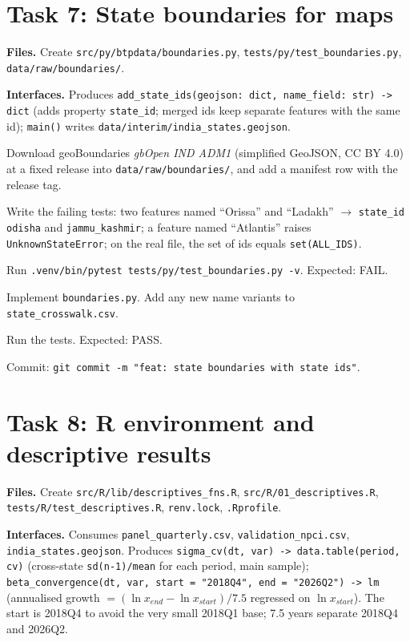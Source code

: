 \documentclass[10pt,a4paper]{article}
\newcommand{\f}[1]{\texttt{#1}}
\begin{document}
\section{Task 7: State boundaries for maps}
\textbf{Files.} Create \f{src/py/btpdata/boundaries.py}, \f{tests/py/test\_boundaries.py}, \f{data/raw/boundaries/}.

\textbf{Interfaces.} Produces \f{add\_state\_ids(geojson: dict, name\_field: str) -> dict} (adds property
\f{state\_id}; merged ids keep separate features with the same id); \f{main()} writes
\f{data/interim/india\_states.geojson}.

\begin{steps}
\item Download geoBoundaries \emph{gbOpen IND ADM1} (simplified GeoJSON, CC BY 4.0) at a fixed release into
      \f{data/raw/boundaries/}, and add a manifest row with the release tag.
\item Write the failing tests: two features named ``Orissa'' and ``Ladakh'' $\to$ \f{state\_id} \f{odisha} and
      \f{jammu\_kashmir}; a feature named ``Atlantis'' raises \f{UnknownStateError}; on the real file, the set of
      ids equals \f{set(ALL\_IDS)}.
\item Run \f{.venv/bin/pytest tests/py/test\_boundaries.py -v}. Expected: FAIL.
\item Implement \f{boundaries.py}. Add any new name variants to \f{state\_crosswalk.csv}.
\item Run the tests. Expected: PASS.
\item Commit: \f{git commit -m "feat: state boundaries with state ids"}.
\end{steps}

\section{Task 8: R environment and descriptive results}
\textbf{Files.} Create \f{src/R/lib/descriptives\_fns.R}, \f{src/R/01\_descriptives.R}, \f{tests/R/test\_descriptives.R},
\f{renv.lock}, \f{.Rprofile}.

\textbf{Interfaces.} Consumes \f{panel\_quarterly.csv}, \f{validation\_npci.csv}, \f{india\_states.geojson}. Produces
\f{sigma\_cv(dt, var) -> data.table(period, cv)} (cross-state \f{sd(n-1)/mean} for each period, main sample);
\f{beta\_convergence(dt, var, start = "2018Q4", end = "2026Q2") -> lm} (annualised growth $= (\ln x_{end} - \ln
x_{start})/7.5$ regressed on $\ln x_{start}$). The start is 2018Q4 to avoid the very small 2018Q1 base;
7.5 years separate 2018Q4 and 2026Q2.
\end{document}
